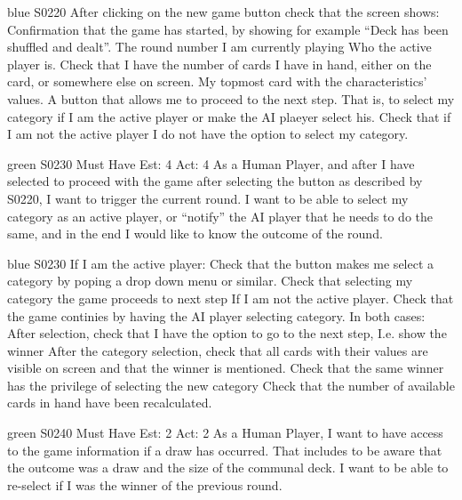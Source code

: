 \begin{card}{blue}
{S0220}{}{}{}
After clicking on the new game button check that the screen shows: Confirmation that the game has started, by showing for example ``Deck has been shuffled and dealt''.
The round number I am currently playing Who the active player is.
Check that I have the number of cards I have in hand, either on the card, or somewhere else on screen.
My topmost card with the characteristics' values.
A button that allows me to proceed to the next step. 
That is, to select my category if I am the active player or make the AI plaeyer select his. 
Check that if I am not the active player I do not have the option to select my category.
\end{card}


\newpage

\begin{card}{green}
{S0230}
{Must Have}
{Est: 4}
{Act: 4}
As a Human Player, and after I have selected to proceed with the game after selecting the button as described by S0220, I want to trigger the current round.
I want to be able to select my category as an active player, or ``notify'' the AI player that he needs to do the same, and in the end I would like to know the outcome of the round.
\end{card}

\begin{card}{blue}
{S0230}{}{}{}
If I am the active player: Check that the button makes me select a category by poping a drop down menu or similar. 
Check that selecting my category the game proceeds to next step If I am not the active player. 
Check that the game continies by having the AI player selecting category.
In both cases: After selection, check that I have the option to go to the next step, I.e. show the winner After the category selection, check that all cards with their values are visible on screen and that the winner is mentioned. 
Check that the same winner has the privilege of selecting the new category Check that the number of available cards in hand have been recalculated.
\end{card}


\newpage

\begin{card}{green}
{S0240}
{Must Have}
{Est: 2}
{Act: 2}
As a Human Player, I want to have access to the game information if a draw has occurred. 
That includes to be aware that the outcome was a draw and the size of the communal deck. 
I want to be able to re-select if I was the winner of the previous round. 
\end{card}

